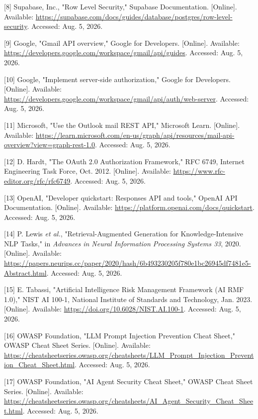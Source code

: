 \documentclass[
]{report}
\begin{document}
{[}8{]} Supabase, Inc., "Row Level Security," Supabase Documentation.
{[}Online{]}. Available:
\url{https://supabase.com/docs/guides/database/postgres/row-level-security}.
Accessed: Aug. 5, 2026.

{[}9{]} Google, "Gmail API overview," Google for Developers.
{[}Online{]}. Available:
\url{https://developers.google.com/workspace/gmail/api/guides}.
Accessed: Aug. 5, 2026.

{[}10{]} Google, "Implement server-side authorization," Google for
Developers. {[}Online{]}. Available:
\url{https://developers.google.com/workspace/gmail/api/auth/web-server}.
Accessed: Aug. 5, 2026.

{[}11{]} Microsoft, "Use the Outlook mail REST API," Microsoft Learn.
{[}Online{]}. Available:
\url{https://learn.microsoft.com/en-us/graph/api/resources/mail-api-overview?view=graph-rest-1.0}.
Accessed: Aug. 5, 2026.

{[}12{]} D. Hardt, "The OAuth 2.0 Authorization Framework," RFC 6749,
Internet Engineering Task Force, Oct. 2012. {[}Online{]}. Available:
\url{https://www.rfc-editor.org/rfc/rfc6749}. Accessed: Aug. 5, 2026.

{[}13{]} OpenAI, "Developer quickstart: Responses API and tools," OpenAI
API Documentation. {[}Online{]}. Available:
\url{https://platform.openai.com/docs/quickstart}. Accessed: Aug. 5,
2026.

{[}14{]} P. Lewis \emph{et al.}, "Retrieval-Augmented Generation for
Knowledge-Intensive NLP Tasks," in \emph{Advances in Neural Information
Processing Systems 33}, 2020. {[}Online{]}. Available:
\url{https://papers.neurips.cc/paper/2020/hash/6b493230205f780e1bc26945df7481e5-Abstract.html}.
Accessed: Aug. 5, 2026.

{[}15{]} E. Tabassi, "Artificial Intelligence Risk Management Framework
(AI RMF 1.0)," NIST AI 100-1, National Institute of Standards and
Technology, Jan. 2023. {[}Online{]}. Available:
\url{https://doi.org/10.6028/NIST.AI.100-1}. Accessed: Aug. 5, 2026.

{[}16{]} OWASP Foundation, "LLM Prompt Injection Prevention Cheat
Sheet," OWASP Cheat Sheet Series. {[}Online{]}. Available:
\url{https://cheatsheetseries.owasp.org/cheatsheets/LLM_Prompt_Injection_Prevention_Cheat_Sheet.html}.
Accessed: Aug. 5, 2026.

{[}17{]} OWASP Foundation, "AI Agent Security Cheat Sheet," OWASP Cheat
Sheet Series. {[}Online{]}. Available:
\url{https://cheatsheetseries.owasp.org/cheatsheets/AI_Agent_Security_Cheat_Sheet.html}.
Accessed: Aug. 5, 2026.
\end{document}
